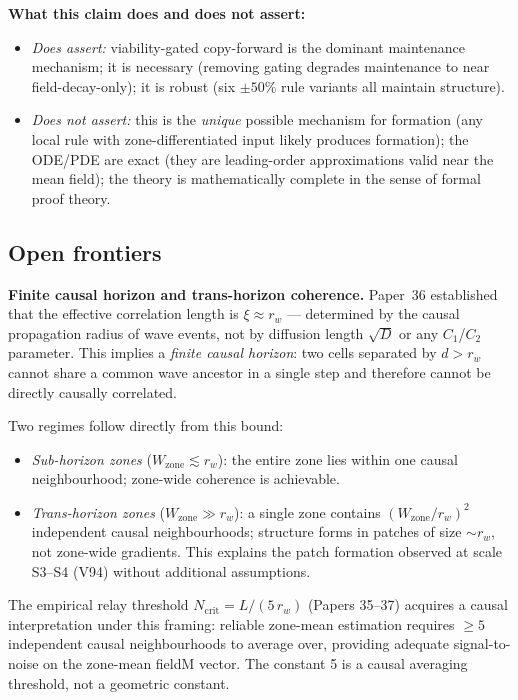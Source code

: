 \documentclass[11pt]{article}
\begin{document}
\textbf{What this claim does and does not assert:}
\begin{itemize}[itemsep=2pt]
\item \textit{Does assert:} viability-gated copy-forward is the dominant maintenance mechanism;
  it is necessary (removing gating degrades maintenance to near field-decay-only);
  it is robust (six $\pm50\%$ rule variants all maintain structure).
\item \textit{Does not assert:} this is the \emph{unique} possible mechanism for formation
  (any local rule with zone-differentiated input likely produces formation);
  the ODE/PDE are exact (they are leading-order approximations valid near the mean field);
  the theory is mathematically complete in the sense of formal proof theory.
\end{itemize}

\subsection{Open frontiers}

\textbf{Finite causal horizon and trans-horizon coherence.}
Paper~36 established that the effective correlation length is $\xi \approx r_w$ ---
determined by the causal propagation radius of wave events, not by diffusion length $\sqrt{D}$
or any $C_1$/$C_2$ parameter.
This implies a \emph{finite causal horizon}: two cells separated by $d > r_w$ cannot share
a common wave ancestor in a single step and therefore cannot be directly causally correlated.

Two regimes follow directly from this bound:
\begin{itemize}[itemsep=1pt]
  \item \emph{Sub-horizon zones} ($W_\mathrm{zone} \lesssim r_w$): the entire zone lies within
    one causal neighbourhood; zone-wide coherence is achievable.
  \item \emph{Trans-horizon zones} ($W_\mathrm{zone} \gg r_w$): a single zone contains
    $(W_\mathrm{zone}/r_w)^2$ independent causal neighbourhoods; structure forms in patches
    of size $\sim r_w$, not zone-wide gradients.
    This explains the patch formation observed at scale S3--S4 (V94) without additional
    assumptions.
\end{itemize}

The empirical relay threshold $N_\mathrm{crit} = L/(5\,r_w)$ (Papers 35--37) acquires
a causal interpretation under this framing:
reliable zone-mean estimation requires $\geq 5$ independent causal neighbourhoods to average
over, providing adequate signal-to-noise on the zone-mean fieldM vector.
The constant 5 is a causal averaging threshold, not a geometric constant.
\end{document}
